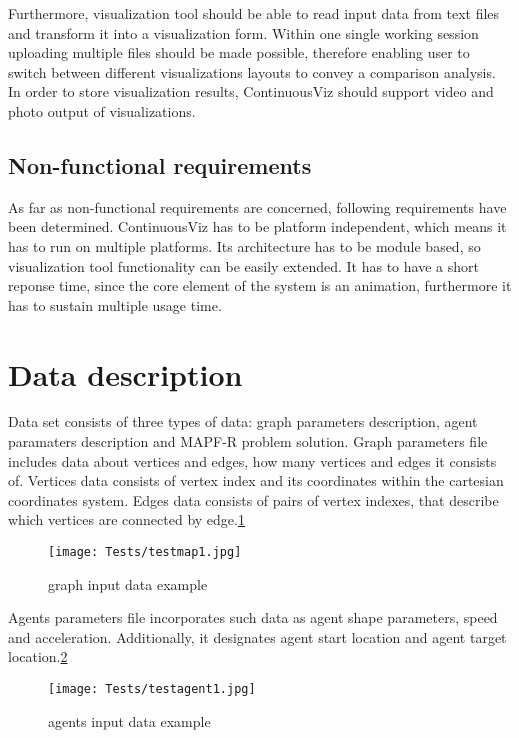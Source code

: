 \documentclass[thesis=B,english]{FITthesis}[2019/12/23]
\begin{document}
Furthermore, visualization tool should be able to read input data from text files and transform it into a visualization form. Within one single working session uploading multiple files should be made possible, therefore enabling user to switch between different visualizations layouts to convey a comparison analysis. In order to store visualization results, ContinuousViz should support video and photo output of visualizations.

\subsection{Non-functional requirements}

As far as non-functional requirements are concerned, following requirements have been determined. ContinuousViz has to be platform independent, which means it has to run on multiple platforms. Its architecture has to be module based, so visualization tool functionality can be easily extended. It has to have a short reponse time, since the core element of the system is an animation, furthermore it has to sustain multiple usage time.         

\section{Data description}

Data set consists of three types of data: graph parameters description, agent paramaters description and MAPF-R problem solution. Graph parameters file includes data about vertices and edges, how many vertices and edges it consists of. Vertices data consists of vertex index and its coordinates within the cartesian coordinates system. Edges data consists of pairs of vertex indexes, that describe which vertices are connected by edge.\ref{fig:float104}   


\begin{figure}[H]
	\texttt{[image: Tests/testmap1.jpg]}
	\caption[graph input data example]{graph input data example}\label{fig:float104}
\end{figure}

Agents parameters file incorporates such data as agent shape parameters, speed and acceleration. Additionally, it designates agent start location and agent target location.\ref{fig:float105}

\begin{figure}[H]
	\texttt{[image: Tests/testagent1.jpg]}
	\caption[agents input data example]{agents input data example}\label{fig:float105}
\end{figure}
\end{document}
